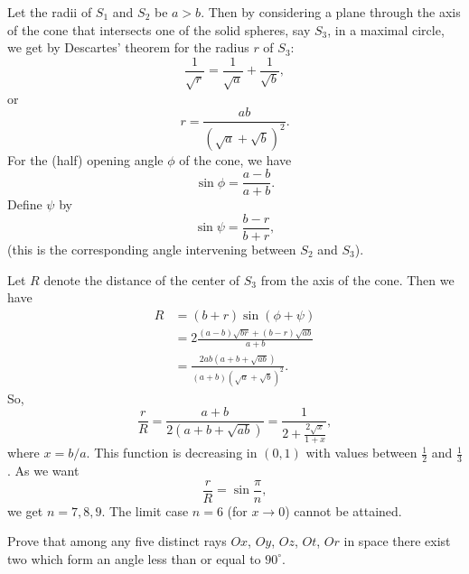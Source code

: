 \begin{solution}[name={Solution by Spanferkel}]
	Let the radii of $S_1$ and $S_2$ be $a>b$. Then by considering a plane through the axis of the cone that intersects one of the solid spheres, say $S_3$, in a maximal circle, we get by Descartes' theorem for the radius $r$ of $S_3$:
	$$\frac1{\sqrt{r}}=\frac1{\sqrt{a}}+\frac1{\sqrt{b}},$$ or $$r=\frac{ab}{(\sqrt{a}+\sqrt{b})^2}.$$
	For the (half) opening angle $\phi$ of the cone, we have $$\sin\phi=\frac{a-b}{a+b}.$$ Define $\psi$ by $$\sin\psi=\frac{b-r}{b+r},$$ (this is the corresponding angle intervening between $S_2$ and $S_3$).
	
	Let $R$ denote the distance of the center of $S_3$ from the axis of the cone. Then we have
	\begin{align*}
		R &= (b+r)\sin(\phi+\psi)\\
		&=2\frac{(a-b)\sqrt{br}+(b-r)\sqrt{ab}}{a+b} \\
		&=\frac{2ab(a+b+\sqrt{ab})}{(a+b)(\sqrt{a}+\sqrt{b})^2}.
	\end{align*}
	So, $$\frac rR=\frac{a+b}{2(a+b+\sqrt{ab})}=\frac{1}{2+\frac{2\sqrt{x}}{1+x}},$$ where $x=b/a$. This function is decreasing in $(0,1)$ with values between $\frac12$ and $\frac13$. As we want $$\frac rR=\sin\frac\pi n,$$ we get $n=7,8,9$. The limit case $n=6$ (for $x\to 0$) cannot be attained.
\end{solution}




\begin{question}[name={1987 Vietnam}]
	Prove that among any five distinct rays $ Ox$, $ Oy$, $ Oz$, $ Ot$, $ Or$ in space there exist two which form an angle less than or equal to $ 90^{\circ}$.
\end{question}

